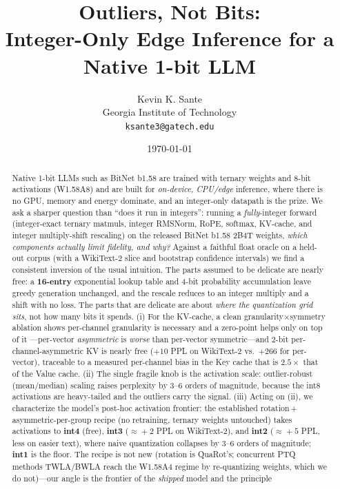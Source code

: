 \documentclass[11pt]{article}
\title{\bf Outliers, Not Bits:\\
Integer-Only Edge Inference for a Native 1-bit LLM}
\author{Kevin K. Sante\\Georgia Institute of Technology\\\texttt{ksante3@gatech.edu}}
\date{\today}
\begin{document}
\maketitle

\begin{abstract}
Native 1-bit LLMs such as BitNet b1.58 are trained with ternary weights and 8-bit
activations (W1.58A8) and are built for \emph{on-device, CPU/edge} inference, where
there is no GPU, memory and energy dominate, and an integer-only datapath is the
prize. We ask a sharper question than ``does it run in integers'': running a
\emph{fully}-integer forward (integer-exact ternary matmuls, integer RMSNorm, RoPE,
softmax, KV-cache, and integer multiply-shift rescaling) on the released BitNet
b1.58 2B4T weights, \emph{which components actually limit fidelity, and why?} Against
a faithful float oracle on a held-out corpus (with a WikiText-2 slice and bootstrap
confidence intervals) we find a consistent inversion of the usual intuition. The
parts assumed to be delicate are nearly free: a \textbf{16-entry} exponential
lookup table and 4-bit probability accumulation leave greedy generation unchanged,
and the rescale reduces to an integer multiply and a shift with no loss. The parts
that are delicate are about \emph{where the quantization grid sits}, not how many
bits it spends. (i) For the KV-cache, a clean granularity$\times$symmetry ablation
shows per-channel granularity is necessary and a zero-point helps only on top of it
---per-vector \emph{asymmetric} is \emph{worse} than per-vector symmetric---and
2-bit per-channel-asymmetric KV is nearly free ($+10$ PPL on WikiText-2 vs.\ $+266$
for per-vector), traceable to a measured per-channel bias in the Key cache that is
$2.5\times$ that of the Value cache. (ii) The single fragile knob is the activation
scale: outlier-robust (mean/median) scaling raises perplexity by 3--6 orders of
magnitude, because the int8 activations are heavy-tailed and the outliers carry the
signal. (iii) Acting on (ii), we characterize the model's post-hoc activation
frontier: the established rotation\,+\,asymmetric-per-group recipe (no retraining,
ternary weights untouched) takes activations to \textbf{int4} (free), \textbf{int3}
($\approx\!+2$ PPL on WikiText-2), and \textbf{int2} ($\approx\!+5$ PPL, less on
easier text), where naive quantization collapses by $3$--$6$ orders of magnitude;
\textbf{int1} is the floor. The recipe is not new (rotation is QuaRot's; concurrent
PTQ methods TWLA/BWLA reach the W1.58A4 regime by re-quantizing weights, which we do
not)---our angle is the frontier of the \emph{shipped} model and the principle

\end{abstract}
\end{document}
